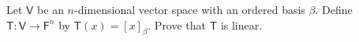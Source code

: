 Let $\mathsf{V}$ be an $n$-dimensional vector space with an ordered
basis $\beta$. Define $\mathsf{T}\colon\mathsf{V}\to\mathsf{F}^n$ by
$\mathsf{T}(x) = \left[x\right]_\beta$. Prove that $\mathsf{T}$ is linear.
